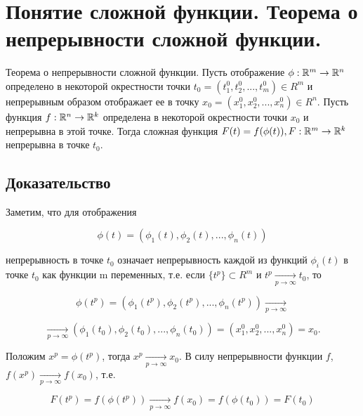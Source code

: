 \section{Понятие сложной функции. Теорема о непрерывности сложной функции.}

Теорема о непрерывности сложной функции. 
Пусть отображение $\phi : \mathbb{R}^m \rightarrow \mathbb{R}^n$ определено в некоторой окрестности точки $t_0 = (t^0_1, t^0_2, ..., t^0_m) \in R^m$ и непрерывным образом отображает ее в точку $x_0 = (x_1^0, x_2^0, ..., x_n^0) \in R^n$. Пусть функция $f: \mathbb{R}^n \rightarrow \mathbb{R}^k$ определена в некоторой окрестности точки $x_0$ и непрерывна в этой точке. Тогда сложная функция $F(t) = f(\phi (t)), F:\mathbb{R}^m \rightarrow \mathbb{R}^k$ непрерывна в точке $t_0$.

\subsection{Доказательство}

Заметим, что для отображения 

\begin{displaymath}
    \phi (t) = (\phi _1(t), \phi _2(t), ..., \phi _n(t))
\end{displaymath}

непрерывность в точке $t_0$ означает непрерывность каждой из функций $\phi _i(t)$ в точке $t_0$ как функции m переменных, т.е. если $\{t^p\} \subset R^m$ и $t^p \underset{p \rightarrow \infty}{\longrightarrow} t_0$, то

\begin{displaymath}
    \phi (t^p) = (\phi _1(t^p), \phi _2(t^p), ..., \phi _n(t^p)) \underset{p \rightarrow \infty}{\longrightarrow} 
\end{displaymath}

\begin{displaymath}
    \underset{p \rightarrow \infty}{\longrightarrow} (\phi _1(t_0), \phi _2(t_0), ..., \phi _n(t_0)) = (x_1^0, x_2^0, ..., x_n^0) = x_0.
\end{displaymath}

Положим $x^p = \phi (t^p)$, тогда $x^p \underset{p \rightarrow \infty}{\longrightarrow} x_0$. В силу непрерывности функции $f$, $f(x^p) \underset{p \rightarrow \infty}{\longrightarrow} f(x_0)$, т.е. 

\begin{displaymath}
    F(t^p) = f(\phi (t^p)) \underset{p \rightarrow \infty}{ \longrightarrow} f(x_0) = f(\phi (t_0)) = F(t_0)
\end{displaymath}
